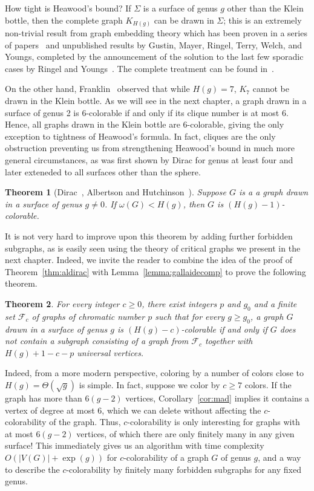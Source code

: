 \documentclass[12pt,twoside,openright,a4paper]{book}
\newtheorem{theorem}{Theorem}[chapter]
\newcommand{\FF}{\mathcal{F}}
\begin{document}
How tight is Heawood's bound?  If $\Sigma$ is a surface of genus $g$ other than the Klein bottle, then the complete graph
$K_{H(g)}$ can be drawn in $\Sigma$; this is an extremely non-trivial result from graph embedding theory
which has been proven in a series of papers~\cite{ringel54,ringel61,twyoungs,youngs67} and unpublished results by Gustin, Mayer, Ringel, Terry, Welch, and Youngs,
completed by the announcement of the solution to the last few sporadic cases by Ringel and Youngs~\cite{ringel}.  The complete
treatment can be found in~\cite{ringelbook}.

On the other hand, Franklin~\cite{franklin} observed that while $H(g)=7$, $K_7$ cannot be drawn in the Klein bottle.
As we will see in the next chapter, a graph drawn in a surface of genus 2 is 6-colorable
if and only if its clique number is at most 6. Hence, all graphs drawn in the Klein bottle are 6-colorable,
giving the only exception to tightness of Heawood's formula.
In fact, cliques are the only obstruction preventing us from strengthening Heawood's bound in much more general circumstances,
as was first shown by Dirac for genus at least four and later exteneded to all surfaces other than the sphere.
\begin{theorem}[Dirac~\cite{dirac1952,dirac1957short},  Albertson and Hutchinson~\cite{albertson1979three}]\label{thm:dirac}
Suppose $G$ is a a graph drawn in a surface of genus $g\neq 0$.  If $\omega(G)<H(g)$, then $G$ is $(H(g)-1)$-colorable.
\end{theorem}

It is not very hard to improve upon this theorem by adding further forbidden subgraphs, as is
easily seen using the theory of critical graphs we present in the next chapter.  Indeed,
we invite the reader to combine the idea of the proof of Theorem~\ref{thm:aldirac} with
Lemma~\ref{lemma:gallaidecomp} to prove the following theorem.
\begin{theorem}
For every integer $c\ge 0$, there exist integers $p$ and $g_0$ and a finite set $\FF_c$ of graphs of chromatic number $p$
such that for every $g\ge g_0$, a graph $G$ drawn in a surface of genus $g$ is $(H(g)-c)$-colorable if and only if
$G$ does not contain a subgraph consisting of a graph from $\FF_c$ together with $H(g)+1-c-p$ universal vertices.
\end{theorem}

Indeed, from a more modern perspective, coloring by a number of colors close to $H(g)=\Theta(\sqrt{g})$ is simple.
In fact, suppose we color by $c\ge 7$ colors.  If the graph has more than $6(g-2)$ vertices, Corollary~\ref{cor:mad} implies
it contains a vertex of degree at most $6$, which we can delete without affecting the $c$-colorability of the graph.
Thus, $c$-colorability is only interesting for graphs with at most $6(g-2)$ vertices, of which there are only finitely
many in any given surface!  This immediately gives us an algorithm with time complexity $O(|V(G)|+\exp(g))$ for $c$-colorability
of a graph $G$ of genus $g$, and a way to describe the $c$-colorability by finitely many forbidden subgraphs for any fixed genus.
\end{document}
